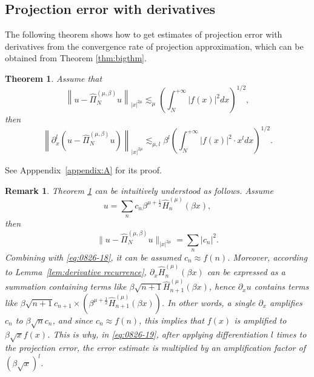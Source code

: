 \documentclass[pdflatex,sn-aps]{sn-jnl}%
\theoremstyle{thmstyleone}%
\newtheorem{theorem}{Theorem}[section]%
\theoremstyle{thmstyletwo}%
\newtheorem{remark}{Remark}%
\theoremstyle{thmstylethree}%
\begin{document}
\subsection{Projection error with derivatives}
The following theorem shows how to get estimates of projection error with derivatives from the convergence rate of projection approximation, which can be obtained from Theorem \ref{thm:bigthm}.
\begin{theorem}\label{thm:0826-2}
  Assume that
  \begin{equation}\label{eq:0826-18}
    \left\|u-\widehat{\Pi}_N^{(\mu, \beta)} u\right\|_{|x|^{2 \mu}} \lesssim_\mu\left(\int_N^{+\infty}|f(x)|^2 d x\right)^{1 / 2},
  \end{equation}
  then
  \begin{equation}\label{eq:0826-19}
    \left\|\partial_x^l\left(u-\widehat{\Pi}_N^{(\mu, \beta)} u\right)\right\|_{|x|^{2 \mu}} \lesssim_{\mu, l} \beta^l \left(\int_{N}^{+\infty} \left|f(x)\right|^2 \cdot x^l d x\right)^{1 / 2}.
  \end{equation}
\end{theorem}
See Apppendix~\ref{appendix:A} for its proof.

\begin{remark}
  Theorem \ref{thm:0826-2} can be intuitively understood as follows.
  Assume 
  \begin{displaymath}
    u = \sum_n c_n  \beta^{\mu+\frac{1}{2}} \widehat{H}_n^{(\mu)}(\beta x),
  \end{displaymath}
  then 
  \begin{displaymath}
    \bigl\|u-\widehat{\Pi}_N^{(\mu, \beta)} u\bigr\|_{|x|^{2 \mu}} = \sum_n |c_n|^2.
  \end{displaymath}
  Combining with \eqref{eq:0826-18}, it can be assumed $c_n \approx f(n)$.
  Moreover, according to Lemma~\ref{lem:derivative recurrence}, $\partial_x \widehat{H}_n^{(\mu)}(\beta x)$
  can be expressed as a summation containing terms like $\beta \sqrt{n+1} \widehat{H}_{n+1}^{(\mu)}(\beta x)$,
  hence $\partial_x u$ contains terms like $\beta \sqrt{n+1} c_{n+1} \times \left(\beta^{\mu+\frac{1}{2}} \widehat{H}_{n+1}^{(\mu)}(\beta x)\right)$.
  In other words, a single $\partial_x$ amplifies $c_n$ to $\beta \sqrt{n} c_n$, and since
  $c_n \approx f(n)$, this implies that $f(x)$ is amplified to $\beta \sqrt{x} f(x)$. 
  This is why, in \eqref{eq:0826-19}, after applying differentiation 
  $l$ times to the projection error, the error estimate is multiplied by an amplification factor of
  $\left(\beta \sqrt{x}\right)^l$.
\end{remark}
\end{document}
